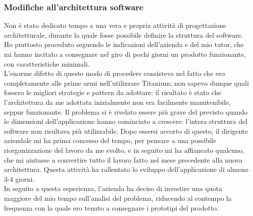 			\subsubsection{Modifiche all'architettura software}
				Non è stato dedicato tempo a una vera e propria attività di progettazione architetturale, durante la quale fosse
				possibile definire la struttura del software. Ho piuttosto proceduto seguendo le indicazioni dell'azienda e del mio
				tutor, che mi hanno incitato a consegnare nel giro di pochi giorni un prodotto funzionante, con caratteristiche
				minimali.\\
				L'enorme difetto di questo modo di procedere consisteva nel fatto che ero completamente alle prime armi
				nell'utilizzare Titanium; non sapevo dunque quali fossero le migliori strategie e pattern da adottare: il risultato
				è stato che l'architettura da me adottata inizialmente non era facilmente manutenibile, seppur funzionante. Il
				problema si è rivelato essere più grave del previsto quando le dimensioni dell'applicazione hanno cominciato
				a crescere: l'intera struttura del software non risultava più utilizzabile. Dopo essersi accorto di questo, il
				dirigente aziendale mi ha prima concesso del tempo, per pensare a una possibile riorganizzazione del lavoro da me
				svolto, e in seguito mi ha affiancato qualcuno, che mi aiutasse a convertire tutto il lavoro fatto nel mese precedente
				alla nuova architettura. Questa attività ha rallentato lo sviluppo dell'applicazione di almeno 3-4 giorni.\\
				In seguito a questa esperienza, l'azienda ha deciso di investire una quota maggiore del mio tempo sull'analisi del
				problema, riducendo al contempo la frequenza con la quale ero tenuto a consegnare i prototipi del prodotto.
